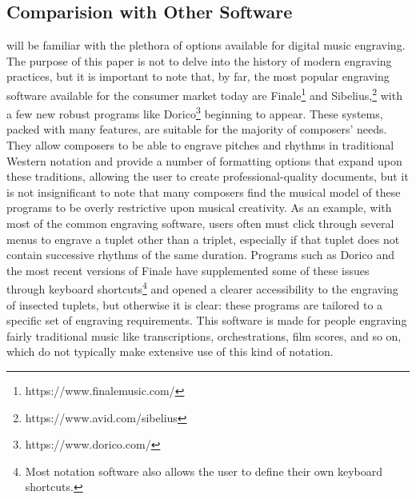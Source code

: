     \subsection{Comparision with Other Software}
 will be familiar with the plethora of options available for digital music engraving. The purpose of this paper is not to delve into the history of modern engraving practices, but it is important to note that, by far, the most popular engraving software available for the consumer market today are Finale\footnote{https://www.finalemusic.com/} and Sibelius,\footnote{https://www.avid.com/sibelius} with a few new robust programs like Dorico\footnote{https://www.dorico.com/} beginning to appear. These systems, packed with many features, are suitable for the majority of composers’ needs. They allow composers to be able to engrave pitches and rhythms in traditional Western notation and provide a number of formatting options that expand upon these traditions, allowing the user to create professional-quality documents, but it is not insignificant to note that many composers find the musical model of these programs to be overly restrictive upon musical creativity. As an example, with most of the common engraving software, users often must click through several menus to engrave a tuplet other than a triplet, especially if that tuplet does not contain successive rhythms of the same duration. Programs such as Dorico and the most recent versions of Finale have supplemented some of these issues through keyboard shortcuts\footnote{Most notation software also allows the user to define their own keyboard shortcuts.} and opened a clearer accessibility to the engraving of insected tuplets, but otherwise it is clear: these programs are tailored to a specific set of engraving requirements. This software is made for people engraving fairly traditional music like transcriptions, orchestrations, film scores, and so on, which do not typically make extensive use of this kind of notation.


